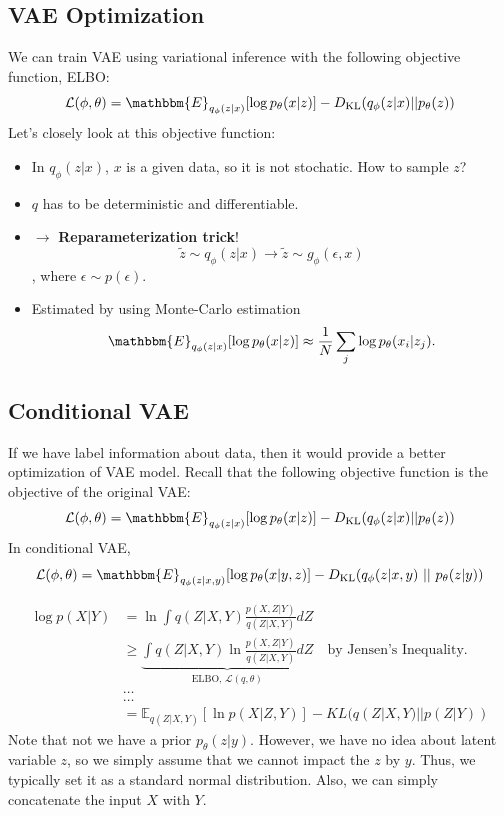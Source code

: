 \subsection{VAE Optimization}
We can train VAE using variational inference with the following objective function, ELBO:
$$\mathcal{L}(\phi,\theta) = \mathbbm{E}_{q_{\phi}(z|x)}[\log p_{\theta}(x|z)] - D_{\textrm{KL}}(q_{\phi}(z|x)||p_{\theta}(z))$$
Let's closely look at this objective function:
\begin{itemize}
	\item In $q_{\phi}(z|x)$, $x$ is a given data, so it is not stochatic. How to sample $z$?
	\item $q$ has to be deterministic and differentiable. 
	\item[] $\to$ \textbf{Reparameterization trick}!
		$$\tilde{z}\sim q_\phi(z|x) \to \tilde{z}\sim g_{\phi}(\epsilon, x)$$, where $\epsilon\sim p(\epsilon).$

	\item Estimated by using Monte-Carlo estimation 
		$$\mathbbm{E}_{q_{\phi}(z|x)}[\log p_{\theta}(x|z)]\approx \frac{1}{N}\sum_j \log p_{\theta}(x_i|z_j).$$
\end{itemize}

\subsection{Conditional VAE}
If we have label information about data, then it would provide a better optimization of VAE model. Recall that the following objective function is the objective of the original VAE:
$$\mathcal{L}(\phi,\theta) = \mathbbm{E}_{q_{\phi}(z|x)}[\log p_{\theta}(x|z)] - D_{\textrm{KL}}(q_{\phi}(z|x)||p_{\theta}(z))$$
In conditional VAE, 
$$\mathcal{L}(\phi,\theta) = \mathbbm{E}_{q_{\phi}(z|x, y)}[\log p_{\theta}(x|y, z)] - D_{\textrm{KL}}(q_{\phi}(z|x, y)\ ||\ p_{\theta}(z|y))$$

\begin{align}
	\log p(X|Y) & = \ln\int q(Z|X, Y) \frac{p(X, Z|Y)}{q(Z|X, Y)}dZ\\
					 & \geq \underbrace{\int q(Z|X, Y) \ln\frac{p(X, Z|Y)}{q(Z|X, Y)}dZ}_{\textrm{ELBO, } \mathcal{L}(q,\theta)} \quad\textrm{by Jensen's Inequality.}\\
					 &\dots\\
					 &\dots\\
					 &= \mathbb{E}_{q(Z|X,Y)} [\ln p(X|Z,Y)]  - KL(q(Z|X,Y)||p(Z|Y)) 
\end{align}
Note that not we have a prior $p_{\theta}(z|y)$. However, we have no idea about latent variable $z$, so we simply assume that we cannot impact the $z$ by $y$. Thus, we typically set it as a standard normal distribution. Also, we can simply concatenate the input $X$ with $Y$. 

